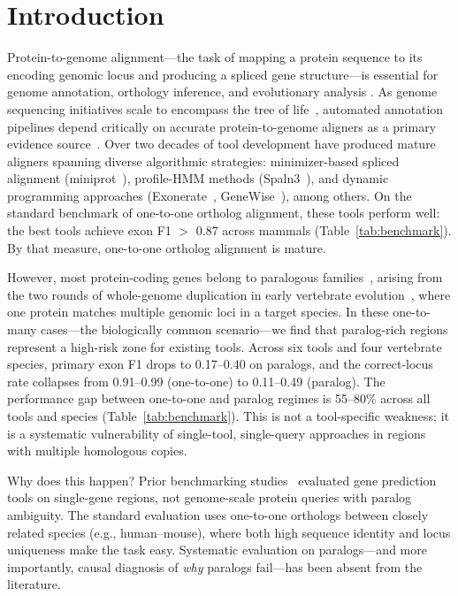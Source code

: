 \section{Introduction}

Protein-to-genome alignment---the task of mapping a protein sequence to its encoding genomic locus and producing a spliced gene structure---is essential for genome annotation, orthology inference, and evolutionary analysis \cite{birney2004gene,stanke2005augustus}. As genome sequencing initiatives scale to encompass the tree of life~\cite{lewin2018ebp}, automated annotation pipelines depend critically on accurate protein-to-genome aligners as a primary evidence source~\cite{gabriel2024braker3,bruna2023galba,keilwagen2018gemoma}. Over two decades of tool development have produced mature aligners spanning diverse algorithmic strategies: minimizer-based spliced alignment (miniprot~\cite{li2023miniprot}), profile-HMM methods (Spaln3~\cite{gotoh2024spaln3}), and dynamic programming approaches (Exonerate~\cite{slater2005exonerate}, GeneWise~\cite{birney2004genewise}), among others. On the standard benchmark of one-to-one ortholog alignment, these tools perform well: the best tools achieve exon F1 $>$ 0.87 across mammals (Table~\ref{tab:benchmark}). By that measure, one-to-one ortholog alignment is mature.

However, most protein-coding genes belong to paralogous families~\cite{ohno2013evolution}, arising from the two rounds of whole-genome duplication in early vertebrate evolution~\cite{dehal2005tworounds}, where one protein matches multiple genomic loci in a target species. In these one-to-many cases---the biologically common scenario---we find that paralog-rich regions represent a high-risk zone for existing tools. Across six tools and four vertebrate species, primary exon F1 drops to 0.17--0.40 on paralogs, and the correct-locus rate collapses from 0.91--0.99 (one-to-one) to 0.11--0.49 (paralog). The performance gap between one-to-one and paralog regimes is 55--80\% across all tools and species (Table~\ref{tab:benchmark}). This is not a tool-specific weakness; it is a systematic vulnerability of single-tool, single-query approaches in regions with multiple homologous copies.

Why does this happen? Prior benchmarking studies~\cite{burset1996evaluation} evaluated gene prediction tools on single-gene regions, not genome-scale protein queries with paralog ambiguity. The standard evaluation uses one-to-one orthologs between closely related species (e.g., human--mouse), where both high sequence identity and locus uniqueness make the task easy. Systematic evaluation on paralogs---and more importantly, causal diagnosis of \emph{why} paralogs fail---has been absent from the literature.

